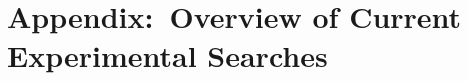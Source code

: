 \documentclass[a4paper,debug,notitlepage,nobib]{tufte-book}
\begin{document}
\chapter{Appendix:~Overview of Current Experimental Searches}
\label{sec:experimental_searches}


%

%

%
% 
%
%
%
%
%
\printbibliography
\end{document}
